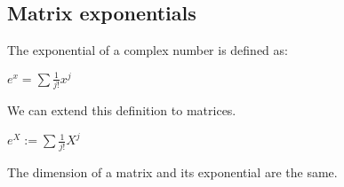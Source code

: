 
\subsection{Matrix exponentials}

The exponential of a complex number is defined as:

\(e^x=\sum \frac{1}{j!}x^j\)

We can extend this definition to matrices.

\(e^X:=\sum \frac{1}{j!}X^j\)

The dimension of a matrix and its exponential are the same.

